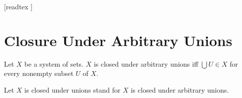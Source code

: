 \documentclass[10pt]{article}
\begin{document}
  \begin{imports}
    \begin{forthel}
      [readtex ]
    \end{forthel}
  \end{imports}


  \section*{Closure Under Arbitrary Unions}

  \begin{forthel}
    \begin{definition}
      Let $X$ be a system of sets.
      $X$ is closed under arbitrary unions iff $\bigcup U \in X$ for every nonempty subset $U$ of $X$.
    \end{definition}

    Let $X$ is closed under unions stand for $X$ is closed under arbitrary unions.
  \end{forthel}
\end{document}
